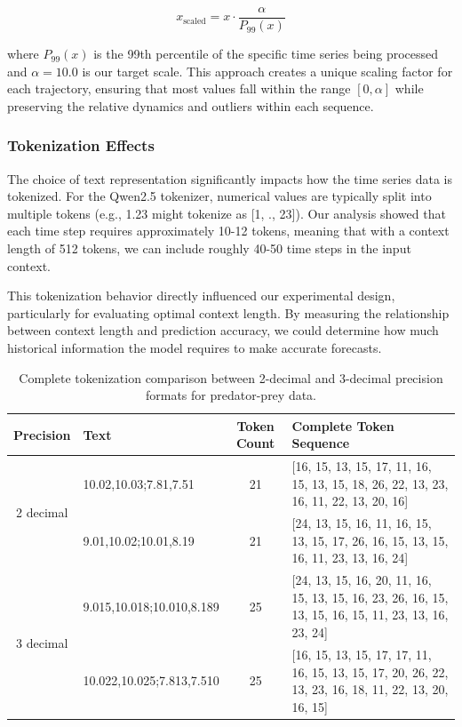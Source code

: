 \documentclass{article}
\begin{document}
\begin{equation}
x_{\text{scaled}} = x \cdot \frac{\alpha}{P_{99}(x)}
\end{equation}

where $P_{99}(x)$ is the 99th percentile of the specific time series being processed and $\alpha=10.0$ is our target scale. This approach creates a unique scaling factor for each trajectory, ensuring that most values fall within the range $[0, \alpha]$ while preserving the relative dynamics and outliers within each sequence. 

\subsubsection*{Tokenization Effects}

The choice of text representation significantly impacts how the time series data is tokenized. For the Qwen2.5 tokenizer, numerical values are typically split into multiple tokens (e.g., 1.23 might tokenize as [1, ., 23]). Our analysis showed that each time step requires approximately 10-12 tokens, meaning that with a context length of 512 tokens, we can include roughly 40-50 time steps in the input context.

This tokenization behavior directly influenced our experimental design, particularly for evaluating optimal context length. By measuring the relationship between context length and prediction accuracy, we could determine how much historical information the model requires to make accurate forecasts.

\begin{table}[H]
\centering
\begin{tabular}{cp{3cm}cp{6cm}}
\hline
\textbf{Precision} & \textbf{Text} & \textbf{Token Count} & \textbf{Complete Token Sequence} \\
\hline
\multirow{2}{*}{2 decimal} & 10.02,10.03;7.81,7.51 & 21 & [16, 15, 13, 15, 17, 11, 16, 15, 13, 15, 18, 26, 22, 13, 23, 16, 11, 22, 13, 20, 16] \\
\cline{2-4}
    & 9.01,10.02;10.01,8.19 & 21 & [24, 13, 15, 16, 11, 16, 15, 13, 15, 17, 26, 16, 15, 13, 15, 16, 11, 23, 13, 16, 24] \\
\hline
\multirow{2}{*}{3 decimal} & 9.015,10.018;10.010,8.189 & 25 & [24, 13, 15, 16, 20, 11, 16, 15, 13, 15, 16, 23, 26, 16, 15, 13, 15, 16, 15, 11, 23, 13, 16, 23, 24] \\
\cline{2-4}
    & 10.022,10.025;7.813,7.510 & 25 & [16, 15, 13, 15, 17, 17, 11, 16, 15, 13, 15, 17, 20, 26, 22, 13, 23, 16, 18, 11, 22, 13, 20, 16, 15] \\
\hline
\end{tabular}
\caption{Complete tokenization comparison between 2-decimal and 3-decimal precision formats for predator-prey data.}
\label{tab:precision_comparison}
\end{table}
\end{document}
